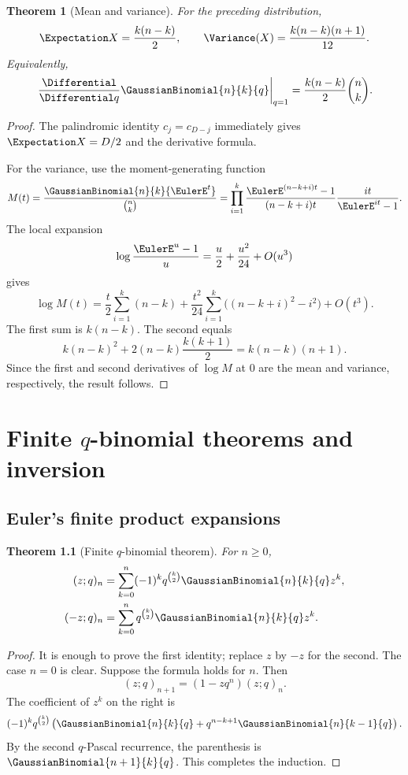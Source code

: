 \documentclass[11pt,a4paper,oneside,openany]{book}
\newtheorem{theorem}{Theorem}[chapter]
\theoremstyle{definition}
\theoremstyle{remark}
\begin{document}
\begin{theorem}[Mean and variance]\label{thm:qbinom-moments}
For the preceding distribution,
\[
 \Expectation X=\frac{k(n-k)}2,
 \qquad
 \Variance(X)=\frac{k(n-k)(n+1)}{12}.
\]
Equivalently,
\[
 \left.\frac{\Differential}{\Differential q}\GaussianBinomial{n}{k}{q}\right|_{q=1}
 =\frac{k(n-k)}2\binom nk.
\]
\end{theorem}

\begin{proof}
The palindromic identity $c_j=c_{D-j}$ immediately gives $\Expectation X=D/2$ and the derivative formula.

For the variance, use the moment-generating function
\[
 M(t)=\frac{\GaussianBinomial{n}{k}{\EulerE^t}}{\binom nk}
 =\prod_{i=1}^{k}
 \frac{\EulerE^{(n-k+i)t}-1}{(n-k+i)t}
 \frac{it}{\EulerE^{it}-1}.
\]
The local expansion
\[
 \log\frac{\EulerE^{u}-1}{u}=\frac u2+\frac{u^2}{24}+O(u^3)
\]
gives
\[
 \log M(t)
 =\frac t2\sum_{i=1}^k(n-k)
 +\frac{t^2}{24}\sum_{i=1}^k\bigl((n-k+i)^2-i^2\bigr)+O(t^3).
\]
The first sum is $k(n-k)$.  The second equals
\[
 k(n-k)^2+2(n-k)\frac{k(k+1)}2
 =k(n-k)(n+1).
\]
Since the first and second derivatives of $\log M$ at $0$ are the mean and variance, respectively, the result follows.
\end{proof}

\chapter{Finite \texorpdfstring{$q$}{q}-binomial theorems and inversion}\label{chap:finite-qbinomial}

\section{Euler's finite product expansions}

\begin{theorem}[Finite $q$-binomial theorem]\label{thm:finite-qbinomial}
For $n\ge0$,
\begin{align}
 (z;q)_n
 &=\sum_{k=0}^{n}(-1)^kq^{\binom k2}\GaussianBinomial{n}{k}{q} z^k,\label{eq:finite-qbinomial-minus}\\
 (-z;q)_n
 &=\sum_{k=0}^{n}q^{\binom k2}\GaussianBinomial{n}{k}{q} z^k.\label{eq:finite-qbinomial-plus}
\end{align}
\end{theorem}

\begin{proof}
It is enough to prove the first identity; replace $z$ by $-z$ for the second.  The case $n=0$ is clear.  Suppose the formula holds for $n$.  Then
\[
 (z;q)_{n+1}=(1-zq^n)(z;q)_n.
\]
The coefficient of $z^k$ on the right is
\[
 (-1)^kq^{\binom k2}
 \left(\GaussianBinomial{n}{k}{q}+q^{n-k+1}\GaussianBinomial{n}{k-1}{q}\right).
\]
By the second $q$-Pascal recurrence, the parenthesis is $\GaussianBinomial{n+1}{k}{q}$.  This completes the induction.
\end{proof}
\end{document}

